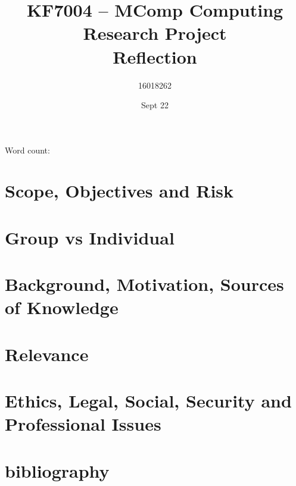 \documentclass[10pt]{article}
\title{KF7004 – MComp Computing Research Project \\ Reflection}
\author{16018262}
\date{Sept 22}
\begin{document}
\maketitle
\begin{center}
	Word count: 
\end{center}
\tableofcontents
\section{Scope, Objectives and Risk}

\section{Group vs Individual}

\section{Background, Motivation, Sources of Knowledge}

\section{Relevance}

\section{Ethics, Legal, Social, Security and Professional Issues}

\section{bibliography}
\printbibliography
\appendix
\end{document}
